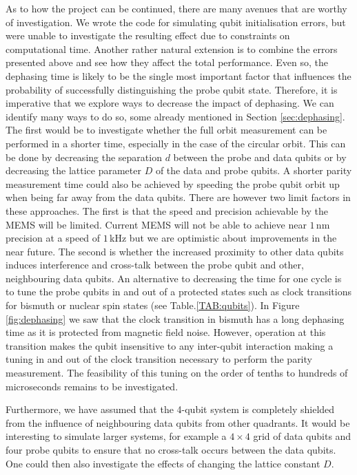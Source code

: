 As to how the project can be continued, there are many avenues that are worthy of investigation. We wrote the code for simulating qubit initialisation errors, but were unable to investigate the resulting effect due to constraints on computational time. Another rather natural extension is to combine the errors presented above and see how they affect the total performance. Even so, the dephasing time is likely to be the single most important factor that influences the probability of successfully distinguishing the probe qubit state. Therefore, it is imperative that we explore ways to decrease the impact of dephasing. We can identify many ways to do so, some already mentioned in Section \ref{sec:dephasing}. The first would be to investigate whether the full orbit measurement can be performed in a shorter time, especially in the case of the circular orbit. This can be done by decreasing the separation $d$ between the probe and data qubits or by decreasing the lattice parameter $D$ of the data and probe qubits. A shorter parity measurement time could also be achieved by speeding the probe qubit orbit up when being far away from the data qubits. 
There are however two limit factors in these approaches. The first is that the speed and precision achievable by the MEMS will be limited. Current MEMS will not be able to achieve near $1\, $nm precision at a speed of $1\, $kHz \cite{Koo2012,Chu2003} but we are optimistic about improvements in the near future. The second is whether the increased proximity to other data qubits induces interference and cross-talk between the probe qubit and other, neighbouring data qubits. 
An alternative to decreasing the time for one cycle is to tune the probe qubits in and out of a protected states such as clock transitions for bismuth or nuclear spin states (see Table.\@ \ref{TAB:qubits}). In Figure \ref{fig:dephasing} we saw that the clock transition in bismuth has a long dephasing time as it is protected from magnetic field noise. However, operation at this transition makes the qubit insensitive to any inter-qubit interaction making a tuning in and out of the clock transition necessary to perform the parity measurement. The feasibility of this tuning on the order of tenths to hundreds of microseconds remains to be investigated.

Furthermore, we have assumed that the 4-qubit system is completely shielded from the influence of neighbouring data qubits from other quadrants. It would be interesting to simulate larger systems, for example a $4\times 4$ grid of data qubits and four probe qubits to ensure that no cross-talk occurs between the data qubits. One could then also investigate the effects of changing the lattice constant $D$. 

